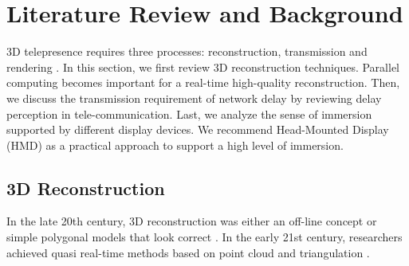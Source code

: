 \section{Literature Review and Background}

3D telepresence requires three processes: reconstruction, transmission and rendering \cite{fuchs2014immersive}. In this section, we first review 3D reconstruction techniques. Parallel computing becomes important for a real-time high-quality reconstruction. Then, we discuss the transmission requirement of network delay by reviewing delay perception in tele-communication. Last, we analyze the sense of immersion supported by different display devices. We recommend Head-Mounted Display (HMD) as a practical approach to support a high level of immersion.




\subsection{3D Reconstruction}

In the late 20th century, 3D reconstruction was either an off-line concept \cite{lorensen1987marching, curless1996volumetric} or simple polygonal models that look correct \cite{kanade1997virtualized, fuchs1994virtual, gibbs1999teleport}. In the early 21st century, researchers achieved quasi real-time methods based on point cloud \cite{gross2003blue, towles20023d} and triangulation \cite{kurillo2008immersive, petit2010multicamera, maimone2011encumbrance}.

